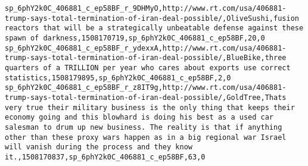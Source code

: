 \documentclass{scrartcl}
\begin{document}
\begin{lstlisting}
sp_6phY2k0C_406881_c_ep58BF_r_9DHMyO,http://www.rt.com/usa/406881-trump-says-total-termination-of-iran-deal-possible/,OliveSushi,fusion reactors that will be a strategically unbeatable defense against these spawn of darkness,1508170719,sp_6phY2k0C_406881_c_ep58BF,20,0
sp_6phY2k0C_406881_c_ep58BF_r_ydexxA,http://www.rt.com/usa/406881-trump-says-total-termination-of-iran-deal-possible/,BlueBike,three quarters of a TRILLION per year who cares about exports use correct statistics,1508179895,sp_6phY2k0C_406881_c_ep58BF,2,0
sp_6phY2k0C_406881_c_ep58BF_r_z8IT9g,http://www.rt.com/usa/406881-trump-says-total-termination-of-iran-deal-possible/,GoldTree,Thats very true their military business is the only thing that keeps their economy going and this blowhard is doing his best as a used car salesman to drum up new business. The reality is that if anything other than these proxy wars happen as in a big regional war Israel will vanish during the process and they know it.,1508170837,sp_6phY2k0C_406881_c_ep58BF,63,0

\end{lstlisting}
\end{document}

